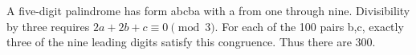 A five-digit palindrome has form abcba with a from one through nine. Divisibility by three requires $2a+2b+c\equiv0\pmod3$. For each of the 100 pairs b,c, exactly three of the nine leading digits satisfy this congruence. Thus there are $\boxed{300}$.
